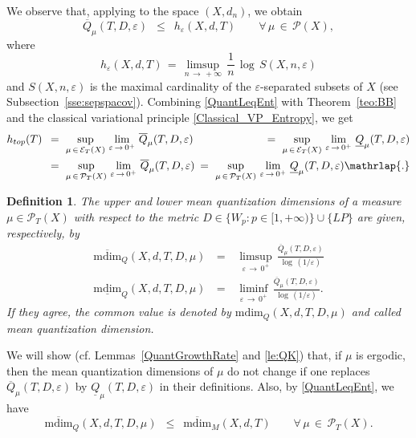 \documentclass[11pt,a4paper,reqno]{amsart}
\theoremstyle{plain}
\theoremstyle{definition}
\newtheorem{definition}[theorem]{Definition}
\newcommand{\ep} {\varepsilon}
\newcommand{\vep}{\varepsilon}
\newcommand{\cP}{{\mathcal P}}
\newcommand{\cE}{{\mathcal E}}
\begin{document}
\smallskip

\noindent We observe that, applying \cite[Proposition~3.4 \& (1.1)]{BB} to the space $(X,d_n)$, we obtain 
\begin{equation}\label{QuantLeqEnt}
\overline{Q}_\mu(T,D,\ep)\,\,\,\leq\,\,\, h_\ep(X,d,T)\qquad \forall\,\mu\,\in\,\cP(X),
\end{equation}
where 
$$h_\ep(X,d,T) \, = \, \limsup_{n \, \to \, +\infty}\, \frac{1}{n}\, \log \,S(X,n,\vep)$$
and $S(X,n,\vep)$ is the maximal cardinality of the $\vep$-separated subsets of $X$ (see Subsection~\ref{sse:sepspacov}). Combining \eqref{QuantLeqEnt} with Theorem~\ref{teo:BB} and the classical variational principle \eqref{Classical_VP_Entropy}, we get 
\begin{equation}\label{classicvp}
\begin{alignedat}{3}
h_{top}(T)\,\,\,
&= \,\,\sup_{\mu \,\in\, \cE_T(X)}\,\lim_{\ep\,\to\,0^+}\, \overline{Q}_\mu(T,D,\ep)\,\,
&= \,\,\sup_{\mu \,\in \,\cE_T(X)}\,\lim_{\ep\,\to\,0^+}\, \underline{Q}_\mu(T,D,\ep) \\
&= \,\,\sup_{\mu \,\in \,\cP_T(X)}\,\lim_{\ep\,\to\,0^+}\, \overline{Q}_\mu(T,D,\ep)\,\,\,
&= \,\,\sup_{\mu \,\in \,\cP_T(X)}\,\lim_{\ep\,\to\,0^+}\, \underline{Q}_\mu(T,D,\ep)\mathrlap{.}
\end{alignedat}
\end{equation}

\smallskip
\begin{definition}
\emph{The \emph{upper} and \emph{lower mean quantization dimensions of a measure $\mu\in\cP_T(X)$ with respect to the metric $D \in \{W_p\colon p \in [1,+\infty)\}\cup \{LP\}$} are given, respectively, by 
\begin{eqnarray*}
\overline{\mathrm{mdim}}_Q(X,d,T,D,\mu) &\,=\,& \limsup_{\ep\,\to\,0^+}\,\frac{\overline{Q}_\mu(T,D,\ep)}{\log\,(1/\ep)} \\ 
\underline{\mathrm{mdim}}_Q(X,d,T,D,\mu) &\,=\,&\liminf_{\ep\,\to\,0^+}\,\frac{\overline{Q}_\mu(T,D,\ep)}{\log\,(1/\ep)}.
\end{eqnarray*}
\noindent If they agree, the common value is denoted by $\mathrm{mdim}_Q(X,d,T,D,\mu)$ and called mean quantization dimension.}
\end{definition}    


We will show (cf. Lemmas~\ref{QuantGrowthRate} and \ref{le:QK}) that, if $\mu$ is ergodic, then the mean quantization dimensions of $\mu$ do not change if one replaces $\overline{Q}_\mu(T,D,\ep)$ by $\underline{Q}_\mu(T,D,\ep)$ in their definitions. Also, by \eqref{QuantLeqEnt}, we have 
\begin{equation}\label{MQuantLeqMDim}
\overline{\mathrm{mdim}}_Q(X,d,T,D,\mu)\,\,\,\leq\,\,\,\overline{\mathrm{mdim}}_M(X,d,T)\qquad\forall \,\mu\,\in\,\cP_T(X).
\end{equation}
\end{document}
